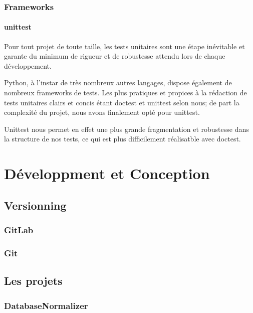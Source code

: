 \documentclass{article}
\begin{document}
\subsubsection{Frameworks}

\paragraph{unittest}

Pour tout projet de toute taille, les tests unitaires sont une étape inévitable et garante du minimum de rigueur et de robustesse attendu lors de chaque développement.

Python, à l'instar de très nombreux autres langages, dispose également de nombreux frameworks de tests.
Les plus pratiques et propices à la rédaction de tests unitaires clairs et concis étant doctest et unittest selon nous;
de part la complexité du projet, nous avons finalement opté pour unittest.

Unittest nous permet en effet une plus grande fragmentation et robustesse dans la structure de nos tests, ce qui est plus difficilement réalisatble  avec doctest.

\newpage


\section{Développment et Conception}

\subsection{Versionning}

\subsubsection{GitLab}

\subsubsection{Git}

\subsection{Les projets}

\subsubsection{DatabaseNormalizer}
\end{document}
